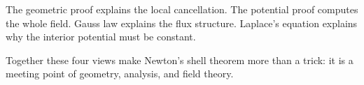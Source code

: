 The geometric proof explains the local cancellation.  The potential proof computes the whole field.  Gauss law explains the flux structure.  Laplace's equation explains why the interior potential must be constant.

Together these four views make Newton's shell theorem more than a trick: it is a meeting point of geometry, analysis, and field theory.
